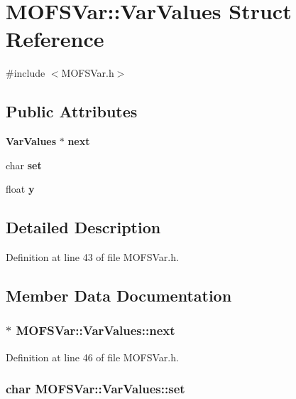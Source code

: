 \section{M\-O\-F\-S\-Var\-:\-:Var\-Values Struct Reference}
\label{structMOFSVar_1_1VarValues}


{\ttfamily \#include $<$M\-O\-F\-S\-Var.\-h$>$}

\subsection*{Public Attributes}
\begin{DoxyCompactItemize}
\item 
{\bf Var\-Values} $\ast$ {\bf next}
\item 
char {\bf set}
\item 
float {\bf y}
\end{DoxyCompactItemize}


\subsection{Detailed Description}


Definition at line 43 of file M\-O\-F\-S\-Var.\-h.



\subsection{Member Data Documentation}
\subsubsection[{next}]{$\ast$ M\-O\-F\-S\-Var\-::\-Var\-Values\-::next}\label{structMOFSVar_1_1VarValues_a5dd9878fc1ce0a92a3a388ccfdb394ba}


Definition at line 46 of file M\-O\-F\-S\-Var.\-h.

\subsubsection[{set}]{\setlength{\rightskip}{0pt plus 5cm}char M\-O\-F\-S\-Var\-::\-Var\-Values\-::set}\label{structMOFSVar_1_1VarValues_ad0dbcb40b513a96c980b2f9e3bb7a599}


